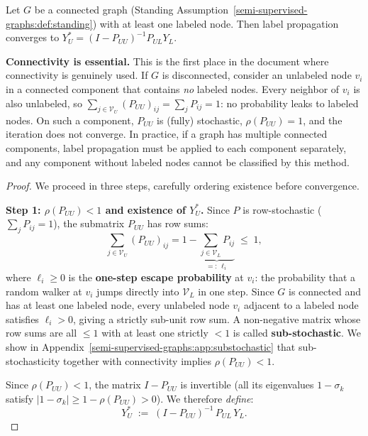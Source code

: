 \begin{notechapter}
\begin{theorem}
\label{semi-supervised-graphs:thm:lp_closed}
Let $G$ be a connected graph (Standing Assumption~\ref{semi-supervised-graphs:def:standing}) with at
least one labeled node. Then label propagation converges to
$Y_U^* = (I - P_{UU})^{-1}P_{UL}Y_L$.
\end{theorem}

\begin{warningbox}
\textbf{Connectivity is essential.} This is the first place in the document
where connectivity is genuinely used. If $G$ is disconnected, consider an
unlabeled node $v_i$ in a connected component that contains \emph{no} labeled
nodes. Every neighbor of $v_i$ is also unlabeled, so
$\sum_{j \in \mathcal{V}_U}(P_{UU})_{ij} = \sum_j P_{ij} = 1$: no
probability leaks to labeled nodes. On such a component, $P_{UU}$ is
(fully) stochastic, $\rho(P_{UU}) = 1$, and the iteration does not converge.
In practice, if a graph has multiple connected components, label propagation
must be applied to each component separately, and any component without
labeled nodes cannot be classified by this method.
\end{warningbox}

\begin{proof}
We proceed in three steps, carefully ordering existence before convergence.
\vspace{0.5em}

\textbf{Step 1: $\rho(P_{UU}) < 1$ and existence of $Y_U^*$.}
Since $P$ is row-stochastic ($\sum_j P_{ij} = 1$), the submatrix $P_{UU}$ has
row sums:
\[
\sum_{j \in \mathcal{V}_U} (P_{UU})_{ij}
= 1 - \underbrace{\sum_{j \in \mathcal{V}_L} P_{ij}}_{=:\,\ell_i} \;\leq\; 1,
\]
where $\ell_i \geq 0$ is the \textbf{one-step escape probability} at $v_i$:
the probability that a random walker at $v_i$ jumps directly into
$\mathcal{V}_L$ in one step. Since $G$ is connected and has at least one
labeled node, every unlabeled node $v_i$ adjacent to a labeled node satisfies
$\ell_i > 0$, giving a strictly sub-unit row sum. A non-negative matrix whose
row sums are all $\leq 1$ with at least one strictly $< 1$ is called
\textbf{sub-stochastic}. We show in Appendix~\ref{semi-supervised-graphs:app:substochastic} that
sub-stochasticity together with connectivity implies $\rho(P_{UU}) < 1$.

Since $\rho(P_{UU}) < 1$, the matrix $I - P_{UU}$ is invertible
(all its eigenvalues $1 - \sigma_k$ satisfy $|1-\sigma_k| \geq 1 - \rho(P_{UU})
> 0$). We therefore \emph{define}:
\[
  Y_U^* \;:=\; (I - P_{UU})^{-1}\,P_{UL}\,Y_L.
\]


\end{proof}
\end{notechapter}
